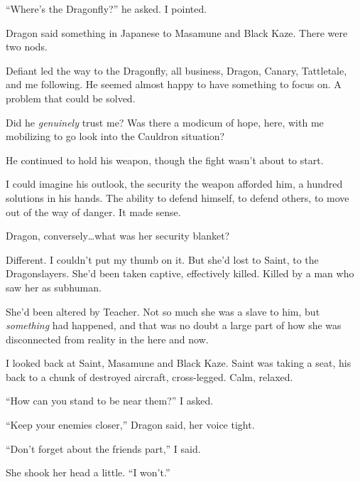 ``Where's the Dragonfly?'' he asked.  I pointed.



Dragon said something in Japanese to Masamune and Black Kaze.  There were two nods.



Defiant led the way to the Dragonfly, all business, Dragon, Canary, Tattletale, and me following.  He seemed almost happy to have something to focus on.  A problem that could be solved.



Did he \emph{genuinely} trust me?  Was there a modicum of hope, here, with me mobilizing to go look into the Cauldron situation?



He continued to hold his weapon, though the fight wasn't about to start.



I could imagine his outlook, the security the weapon afforded him, a hundred solutions in his hands.  The ability to defend himself, to defend others, to move out of the way of danger.  It made sense.



Dragon, conversely\ldots what was her security blanket?



Different.  I couldn't put my thumb on it.  But she'd lost to Saint, to the Dragonslayers.  She'd been taken captive, effectively killed.  Killed by a man who saw her as subhuman.



She'd been altered by Teacher.  Not so much she was a slave to him, but \emph{something} had happened, and that was no doubt a large part of how she was disconnected from reality in the here and now.



I looked back at Saint, Masamune and Black Kaze.  Saint was taking a seat, his back to a chunk of destroyed aircraft, cross-legged.  Calm, relaxed.



``How can you stand to be near them?'' I asked.



``Keep your enemies closer,'' Dragon said, her voice tight.



``Don't forget about the friends part,'' I said.



She shook her head a little.  ``I won't.''




